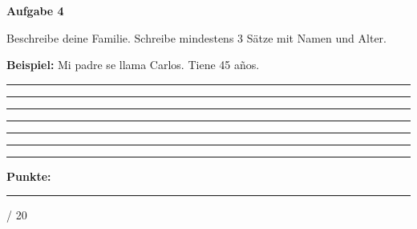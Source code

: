 \documentclass[11pt, a4paper]{article}
\newcommand{\fachfarbe}{spanisch}
\newcommand{\maxpunkte}{20}
\newcommand{\punktebox}[1]{\hfill\fbox{\small \_/#1}}
\newcommand{\luecke}[1]{\rule{#1}{0.4pt}}
\newenvironment{aufgabe}[1]{%
    \needspace{5\baselineskip}%
    \nopagebreak[4]%
    \vspace{10pt}
    \noindent\textbf{\textcolor{\fachfarbe}{Aufgabe #1}}
    \nopagebreak[4]%
    \vspace{5pt}
    \nopagebreak[4]%
    \begin{list}{}{\leftmargin=0pt}
    \item[]
}{%
    \end{list}
}
\begin{document}
\begin{aufgabe}{4}
Beschreibe deine Familie. Schreibe mindestens 3 Sätze mit Namen und Alter. \punktebox{6}
\end{aufgabe}

\begin{hinweis}
\textbf{Beispiel:} Mi padre se llama Carlos. Tiene 45 años.
\end{hinweis}

\noindent\rule{\textwidth}{0.4pt}\vspace{8pt}
\noindent\rule{\textwidth}{0.4pt}\vspace{8pt}
\noindent\rule{\textwidth}{0.4pt}\vspace{8pt}
\noindent\rule{\textwidth}{0.4pt}\vspace{8pt}
\noindent\rule{\textwidth}{0.4pt}\vspace{8pt}
\noindent\rule{\textwidth}{0.4pt}

\vspace{20pt}
\hrule
\vspace{10pt}

\begin{flushright}
\textbf{Punkte:} \luecke{1cm} / \maxpunkte
\end{flushright}
\end{document}
